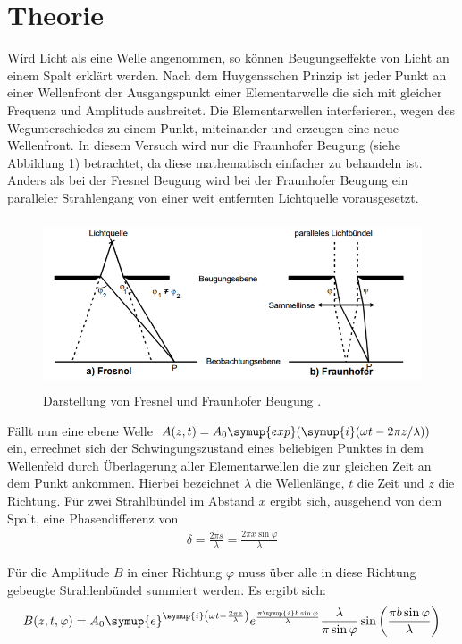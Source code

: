 \section{Theorie}
\label{sec:Theorie}

Wird Licht als eine Welle angenommen, so können Beugungseffekte von Licht an einem Spalt erklärt werden. Nach dem Huygensschen
Prinzip ist jeder Punkt an einer Wellenfront der Ausgangspunkt einer Elementarwelle die sich mit gleicher Frequenz und
Amplitude ausbreitet. Die Elementarwellen interferieren, wegen des Wegunterschiedes zu einem Punkt, miteinander
und erzeugen eine neue Wellenfront. In diesem Versuch wird nur die Fraunhofer Beugung (siehe Abbildung 1) betrachtet, da diese
mathematisch einfacher zu behandeln ist. Anders als bei der Fresnel Beugung wird bei der Fraunhofer Beugung ein
paralleler Strahlengang von einer weit entfernten Lichtquelle vorausgesetzt.


\begin{figure}[H]
  \centering
  \includegraphics[height=5cm]{fraunhofer.PNG}
  \caption{Darstellung von Fresnel und Fraunhofer Beugung \cite{sample}.}
  \label{fig:biegungbild1}
\end{figure}

Fällt nun eine ebene Welle $A(z, t) = A_0 \symup{exp}(\symup{i}(\omega t -2\pi z/\lambda))$ ein, errechnet sich der Schwingungszustand  eines
beliebigen Punktes in dem Wellenfeld durch Überlagerung aller Elementarwellen die zur gleichen Zeit an dem Punkt ankommen. Hierbei bezeichnet
$\lambda$ die Wellenlänge, $t$ die Zeit und $z$ die Richtung.
Für zwei Strahlbündel im Abstand $x$ ergibt sich, ausgehend von dem Spalt, eine Phasendifferenz von
\begin{align}
  \delta = \frac{2\pi s}{\lambda} = \frac{2\pi x \sin{\varphi}}{\lambda}
\end{align}

Für die Amplitude $B$ in einer Richtung $\varphi$ muss über alle in diese Richtung gebeugte Strahlenbündel summiert werden. Es ergibt sich:
\begin{align}
  B(z,t, \varphi) = A_0 \symup{e}^{\symup{i} \left(\omega t - \frac{2\pi z}{\lambda} \right)} e^{\frac{\pi \symup{i} b \sin{\varphi}}{\lambda}} \frac{\lambda}{\pi \sin{\varphi}}
  \sin{\left(\frac{\pi b \sin{\varphi}}{\lambda}\right)}
\end{align}

